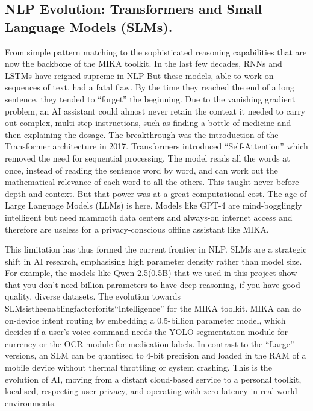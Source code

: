 \documentclass[12pt,a4paper]{report}
\begin{document}
\subsection{NLP Evolution: Transformers and Small Language Models (SLMs).}
 
From simple pattern matching to the sophisticated reasoning capabilities that are now the backbone of the MIKA toolkit. In the last few decades, RNNs and LSTMs have reigned supreme in NLP But these models, able to work on sequences of text, had a fatal flaw. By the time they reached the end of a long sentence, they tended to “forget” the beginning. Due to the vanishing gradient problem, an AI assistant could almost never retain the context it needed to carry out complex, multi-step instructions, such as finding a bottle of medicine and then explaining the dosage. The breakthrough was the introduction of the Transformer architecture in 2017. Transformers introduced “Self-Attention” which removed the need for sequential processing. The model reads all the words at once, instead of reading the sentence word by word, and can work out the mathematical relevance of each word to all the others. This taught never before depth and context. But that power was at a great computational cost. The age of Large Language Models (LLMs) is here. Models like GPT-4 are mind-bogglingly intelligent but need mammoth data centers and always-on internet access and therefore are useless for a privacy-conscious offline assistant like MIKA.

\noindent This limitation has thus formed the current frontier in NLP. SLMs are a strategic shift in AI research, emphasising high parameter density rather than model size. For example, the models like Qwen 2.5(0.5B) that we used in this project show that you don’t need billion parameters to have deep reasoning, if you have good quality, diverse datasets. The evolution towards SLMsistheenablingfactorforits“Intelligence” for the MIKA toolkit. MIKA can do on-device intent routing by embedding a 0.5-billion parameter model, which decides if a user’s voice command needs the YOLO segmentation module for currency or the OCR module for medication labels. In contrast to the “Large” versions, an SLM can be quantised to 4-bit precision and loaded in the RAM of a mobile device without thermal throttling or system crashing. This is the evolution of AI, moving from a distant cloud-based service to a personal toolkit, localised, respecting user privacy, and operating with zero latency in real-world environments.
\end{document}
